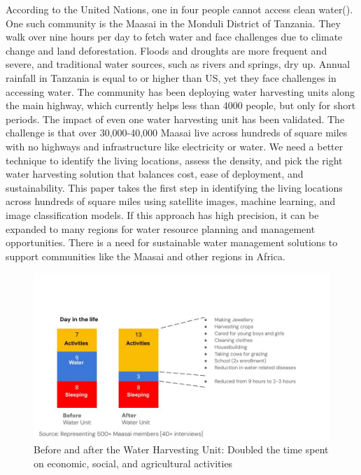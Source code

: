 \documentclass[10pt]{article}
\begin{document}
According to the United Nations, one in four people cannot access clean water(\autocite{United_Nations}). One such community is the Maasai in the Monduli District of Tanzania. They walk over nine hours per day to fetch water and face challenges due to climate change and land deforestation. Floods and droughts are more frequent and severe, and traditional water sources, such as rivers and springs, dry up. Annual rainfall in Tanzania is equal to or higher than US, yet they face challenges in accessing water. The community has been deploying water harvesting units along the main highway, which currently helps less than 4000 people, but only for short periods. The impact of even one water harvesting unit has been validated. The challenge is that over 30,000-40,000 Maasai live across hundreds of square miles with no highways and infrastructure like electricity or water. We need a better technique to identify the living locations, assess the density, and pick the right water harvesting solution that balances cost, ease of deployment, and sustainability. This paper takes the first step in identifying the living locations across hundreds of square miles using satellite images, machine learning, and image classification models. If this approach has high precision, it can be expanded to many regions for water resource planning and management opportunities.  There is a need for sustainable water management solutions to support communities like the Maasai and other regions in Africa.

\begin{figure} [H]
    \centering
    \includegraphics[width=1\linewidth]{images/beforeandafterwhu.jpg}
    \caption{Before and after the Water Harvesting Unit: Doubled the time spent on economic, social, and agricultural activities}
    \label{fig:bef_aft_results}
\end{figure}
\end{document}
